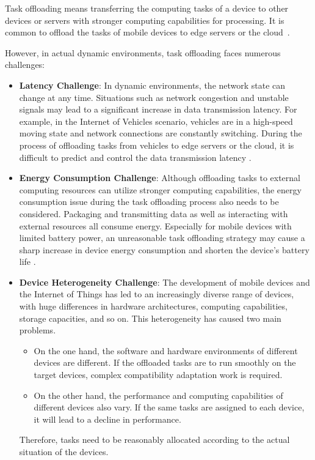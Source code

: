 \documentclass[journal]{IEEEtran}
\begin{document}
Task offloading means transferring the computing tasks of a device to other devices or 
servers with stronger computing capabilities for processing. 
It is common to offload the tasks of mobile devices to edge servers or the cloud~\cite{zheng03}.

However, in actual dynamic environments, task offloading faces numerous challenges:

\begin{itemize}
    \item \textbf{Latency Challenge}: In dynamic environments, the network state can change at any time. Situations such as network congestion and unstable signals may lead to a significant increase in data transmission latency. For example, in the Internet of Vehicles scenario, vehicles are in a high-speed moving state and network connections are constantly switching. During the process of offloading tasks from vehicles to edge servers or the cloud, it is difficult to predict and control the data transmission latency \cite{zheng02}.

    \item \textbf{Energy Consumption Challenge}: Although offloading tasks to external computing resources can utilize stronger computing capabilities, the energy consumption issue during the task offloading process also needs to be considered. Packaging and transmitting data as well as interacting with external resources all consume energy. Especially for mobile devices with limited battery power, an unreasonable task offloading strategy may cause a sharp increase in device energy consumption and shorten the device's battery life \cite{zheng04}.

    \item \textbf{Device Heterogeneity Challenge}: The development of mobile devices and the Internet of Things has led to an increasingly diverse range of devices, with huge differences in hardware architectures, computing capabilities, storage capacities, and so on. This heterogeneity has caused two main problems. 
    \begin{itemize}
        \item On the one hand, the software and hardware environments of different devices are different. If the offloaded tasks are to run smoothly on the target devices, complex compatibility adaptation work is required.
        \item On the other hand, the performance and computing capabilities of different devices also vary. If the same tasks are assigned to each device, it will lead to a decline in performance.
    \end{itemize}
    Therefore, tasks need to be reasonably allocated according to the actual situation of the devices.
\end{itemize}
\end{document}
